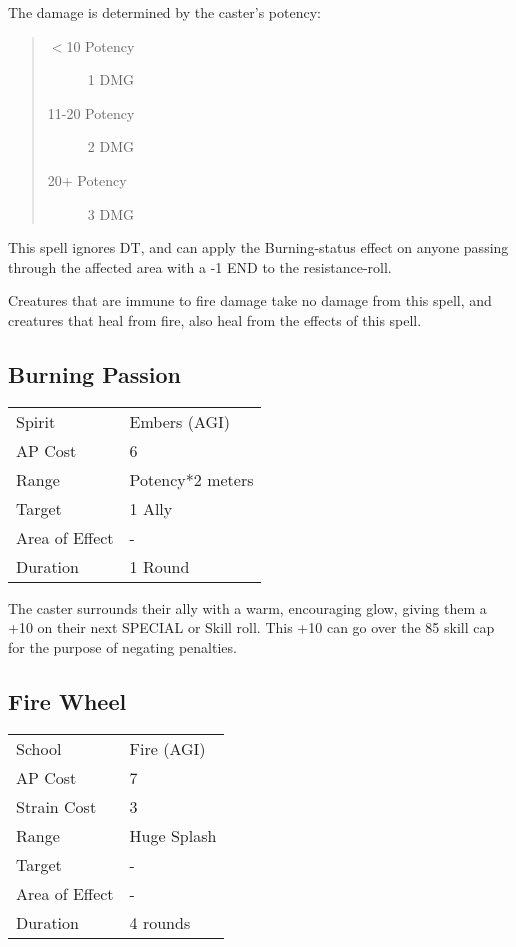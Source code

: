 \documentclass[11pt,a4paper,twocolumn]{book}
\begin{document}
The damage is determined by the caster's potency:
\begin{quote}
	\begin{description}
		\item[$<$10 Potency]	1 DMG
		\item[11-20 Potency]	2 DMG
		\item[20+ Potency]		3 DMG
	\end{description}	
\end{quote}

This spell ignores DT, and can apply the Burning-status effect on anyone passing through the affected area with a -1 END to the resistance-roll.

Creatures that are immune to fire damage take no damage from this spell, and creatures that heal from fire, also heal from the effects of this spell.


\subsection*{Burning Passion}
{
	\begin{tabu} to 70mm{| X[l,4] | X[l,7] |}
		\hline
		Spirit         & Embers (AGI)          \\
		AP Cost        & 6                     \\
		Range          & Potency*2 meters \\
		Target         & 1 Ally                \\
		Area of Effect & -                     \\
		Duration       & 1 Round               \\ \hline
	\end{tabu}
	
}

\medskip

The caster surrounds their ally with a warm, encouraging glow, giving them a +10 on their next SPECIAL or Skill roll. This +10 can go over the 85 skill cap for the purpose of negating penalties.

\subsection*{Fire Wheel}
{
	\begin{tabu} to 75mm{| X[l,4] | X[l,7] |}
		\hline
		School 			&  Fire (AGI)			\\
		AP Cost	      	&  7					\\
		Strain Cost     &  3					\\
		Range     		&  Huge Splash		\\
		Target      	&  -					\\
		Area of Effect  &  -	 				\\
		Duration     	&  4 rounds		\\ \hline
	\end{tabu}
	
}
\end{document}
